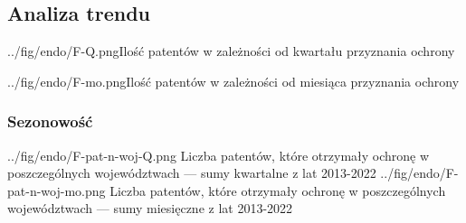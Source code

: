   \newpage



  \newpage\subsection
{Analiza trendu}



  \fig
{../fig/endo/F-Q.png}{Ilość patentów w zależności od kwartału przyznania ochrony}

  \fig
{../fig/endo/F-mo.png}{Ilość patentów w zależności od miesiąca przyznania ochrony}





  \newpage\subsubsection
{Sezonowość}

  \figsides
{../fig/endo/F-pat-n-woj-Q.png}
{ Liczba patentów, które otrzymały ochronę w poszczególnych województwach 
  --- sumy kwartalne z lat 2013-2022 }
{../fig/endo/F-pat-n-woj-mo.png}
{ Liczba patentów, które otrzymały ochronę w poszczególnych województwach 
  --- sumy miesięczne z lat 2013-2022 }
